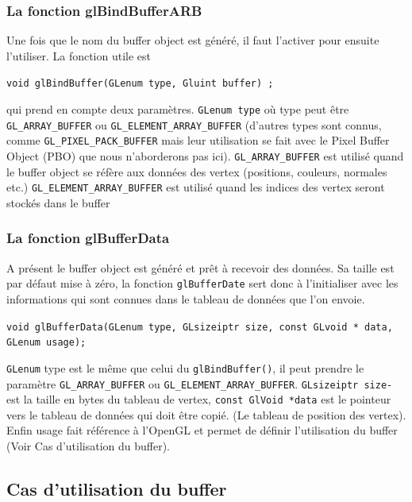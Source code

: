 \subsubsection*{La fonction glBindBufferARB}

Une fois que le nom du buffer object est généré, il faut l’activer pour ensuite l’utiliser. La fonction utile est 
\begin{center}
\verb|void glBindBuffer(GLenum type, Gluint buffer) ;|
\end{center}
qui prend en compte deux paramètres. \verb|GLenum type| où type peut être \verb|GL_ARRAY_BUFFER| ou \verb|GL_ELEMENT_ARRAY_BUFFER| (d’autres types sont connus, comme \verb|GL_PIXEL_PACK_BUFFER| mais leur utilisation se fait avec le Pixel Buffer Object (PBO) que nous n’aborderons pas ici). \verb|GL_ARRAY_BUFFER| est utilisé quand le buffer object se réfère aux données des vertex (positions, couleurs, normales etc.) \verb|GL_ELEMENT_ARRAY_BUFFER| est utilisé quand les indices des vertex seront stockés dans le buffer

\subsubsection*{La fonction glBufferData}

A présent le buffer object est généré et prêt à recevoir des données. Sa taille est par défaut mise à zéro, la fonction \verb|glBufferDate| sert donc à l’initialiser avec les informations qui sont connues dans le tableau de données que l’on envoie.
\begin{center}
\verb|void glBufferData(GLenum type, GLsizeiptr size, const GLvoid * data, |\\
\verb|GLenum usage);|
\end{center}
\verb|GLenum| type est le même que celui du \verb|glBindBuffer()|, il peut prendre le paramètre \verb|GL_ARRAY_BUFFER| ou \verb|GL_ELEMENT_ARRAY_BUFFER|. \verb|GLsizeiptr size-| est la taille en bytes du tableau de vertex, \verb|const GlVoid *data| est le pointeur vers le tableau de données qui doit être copié. (Le tableau de position des vertex). Enfin usage fait référence à l’OpenGL et permet de définir l’utilisation du buffer (Voir Cas d’utilisation du buffer).
\subsection{Cas d'utilisation du buffer}

